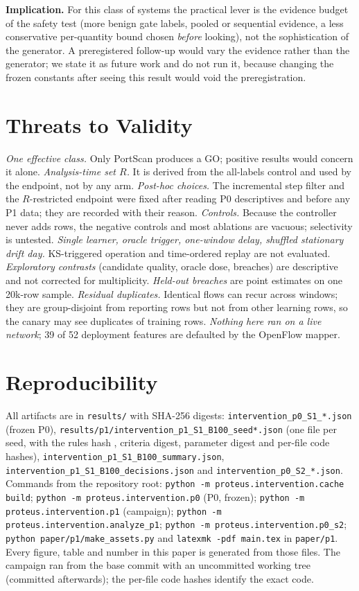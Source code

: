 \documentclass[conference]{IEEEtran}
\begin{document}
\textbf{Implication.} For this class of systems the practical lever is the evidence budget of the safety test (more benign gate labels, pooled or sequential evidence, a less conservative per-quantity bound chosen \emph{before} looking), not the sophistication of the generator. A preregistered follow-up would vary the evidence rather than the generator; we state it as future work and do not run it, because changing the frozen constants after seeing this result would void the preregistration.

\section{Threats to Validity}
\emph{One effective class.} Only PortScan produces a GO; positive results would concern it alone. \emph{Analysis-time set $R$.} It is derived from the all-labels control and used by the endpoint, not by any arm. \emph{Post-hoc choices.} The incremental step filter and the $R$-restricted endpoint were fixed after reading P0 descriptives and before any P1 data; they are recorded with their reason. \emph{Controls.} Because the controller never adds rows, the negative controls and most ablations are vacuous; selectivity is untested. \emph{Single learner, oracle trigger, one-window delay, shuffled stationary drift day.} KS-triggered operation and time-ordered replay are not evaluated. \emph{Exploratory contrasts} (candidate quality, oracle dose, breaches) are descriptive and not corrected for multiplicity. \emph{Held-out breaches} are point estimates on one 20k-row sample. \emph{Residual duplicates.} Identical flows can recur across windows; they are group-disjoint from reporting rows but not from other learning rows, so the canary may see duplicates of training rows. \emph{Nothing here ran on a live network}; 39 of 52 deployment features are defaulted by the OpenFlow mapper.

\section{Reproducibility}
All artifacts are in \texttt{results/} with SHA-256 digests: \texttt{intervention\_p0\_S1\_*.json} (frozen P0), \texttt{results/p1/intervention\_p1\_S1\_B100\_seed*.json} (one file per seed, with the rules hash , criteria digest, parameter digest and per-file code hashes), \texttt{intervention\_p1\_S1\_B100\_summary.json}, \texttt{intervention\_p1\_S1\_B100\_decisions.json} and \texttt{intervention\_p0\_S2\_*.json}. Commands from the repository root:
\texttt{python -m proteus.intervention.cache build};
\texttt{python -m proteus.intervention.p0} (P0, frozen);
\texttt{python -m proteus.intervention.p1} (campaign);
\texttt{python -m proteus.intervention.analyze\_p1};
\texttt{python -m proteus.intervention.p0\_s2};
\texttt{python paper/p1/make\_assets.py} and \texttt{latexmk -pdf main.tex} in \texttt{paper/p1}. Every figure, table and number in this paper is generated from those files. The campaign ran from the base commit \gitSha{} with an uncommitted working tree (committed afterwards); the per-file code hashes identify the exact code.
\end{document}

